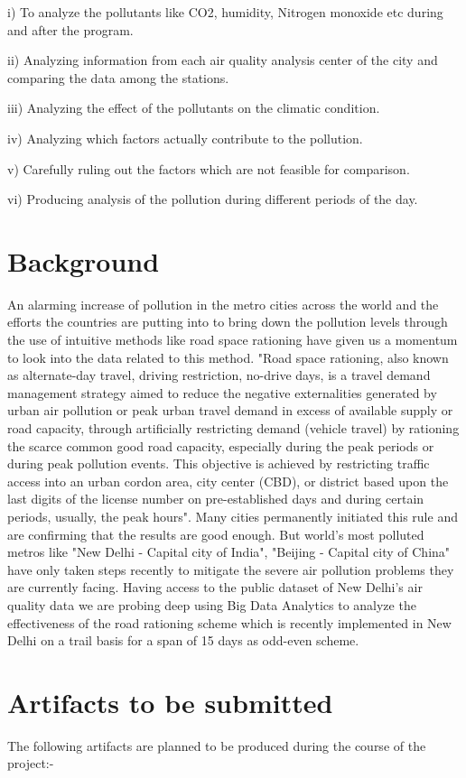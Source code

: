 \documentclass{acm_proc_article-sp}
\begin{document}
i) To analyze the pollutants like CO2, humidity, Nitrogen monoxide etc during and after the program.

ii) Analyzing information from each air quality analysis center of the city and comparing the data among the stations.

iii) Analyzing the effect of the pollutants on the climatic condition.

iv) Analyzing which factors actually contribute to the pollution.

v) Carefully ruling out the factors which are not feasible for comparison.

vi) Producing analysis of the pollution during different periods of the day.


\section{Background}
An alarming increase of pollution in the metro cities across the world and the efforts the countries are putting into to bring down the pollution levels through the use of intuitive methods like road space rationing have given us a momentum to look into the data related to this method. "Road space rationing, also known as alternate-day travel, driving restriction, no-drive days,  is a travel demand management strategy aimed to reduce the negative externalities generated by urban air pollution or peak urban travel demand in excess of available supply or road capacity, through artificially restricting demand (vehicle travel) by rationing the scarce common good road capacity, especially during the peak periods or during peak pollution events. This objective is achieved by restricting traffic access into an urban cordon area, city center (CBD), or district based upon the last digits of the license number on pre-established days and during certain periods, usually, the peak hours". Many cities permanently initiated this rule and are confirming that the results are good enough. But world's most polluted metros like "New Delhi - Capital city of India", "Beijing - Capital city of China" have only taken steps recently to mitigate the severe air pollution problems they are currently facing. Having access to the public dataset of New Delhi's 
air quality data we are probing deep using Big Data Analytics to analyze the effectiveness of the road rationing scheme which is recently implemented in New Delhi on a trail basis for a span of 15 days as odd-even scheme. \cite{RoadSpaceRationing}

\section{Artifacts to be submitted}
The following artifacts are planned to be produced during the course of the project:-
\end{document}
